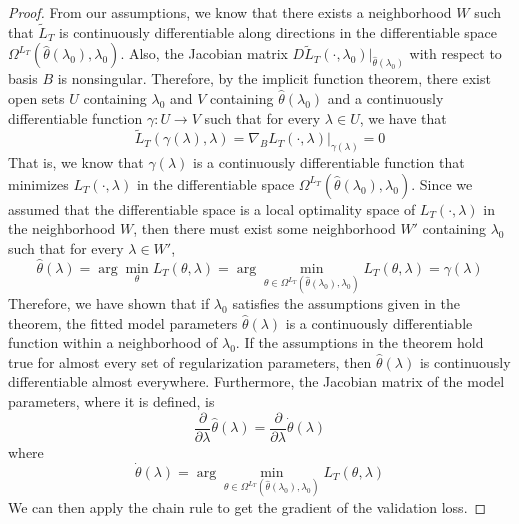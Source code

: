 \documentclass[10pt,letterpaper]{article}
\begin{document}
\begin{proof}
From our assumptions, we know that there exists a neighborhood $W$ such that $\tilde L_T$ is continuously differentiable along directions in the differentiable space $\Omega^{L_T}(\hat \theta(\lambda_0), \lambda_0)$. Also, the Jacobian matrix $D \tilde L_T(\cdot, \lambda_0)|_{\hat \theta(\lambda_0)}$ with respect to basis $B$ is nonsingular. Therefore, by the implicit function theorem, there exist open sets $U$ containing $\lambda_0$ and $V$ containing $\hat \theta(\lambda_0)$ and a continuously differentiable function $\gamma: U \rightarrow V$ such that for every $\lambda \in U$, we have that 
\begin{equation}
\tilde L_T(\gamma(\lambda), \lambda) = \nabla_{B} L_T(\cdot, \lambda)|_{\gamma(\lambda)} = 0
\end{equation}
That is, we know that $\gamma(\lambda)$ is a continuously differentiable function that minimizes $L_T(\cdot, \lambda)$ in the differentiable space  $\Omega^{L_T}(\hat \theta(\lambda_0), \lambda_0)$.
Since we assumed that the differentiable space is a local optimality space of $L_T(\cdot, \lambda)$ in the neighborhood $W$, then there must exist some neighborhood $W'$ containing $\lambda_0$ such that for every $\lambda \in W'$, 
\begin{equation}
\hat \theta(\lambda) =
\arg \min_\theta L_T(\theta, \lambda) =
\arg \min_{\theta \in \Omega^{L_T}(\hat \theta(\lambda_0), \lambda_0)} L_T(\theta, \lambda) =
\gamma(\lambda)
\end{equation}
Therefore, we have shown that if $\lambda_0$ satisfies the assumptions given in the theorem, the fitted model parameters $\hat \theta(\lambda)$ is a continuously differentiable function within a neighborhood of $\lambda_0$. If the assumptions in the theorem hold true for almost every set of regularization parameters, then $\hat \theta(\lambda)$ is continuously differentiable almost everywhere. Furthermore, the Jacobian matrix of the model parameters, where it is defined, is
\begin{equation}
\frac{\partial}{\partial \lambda} \hat \theta(\lambda) = \frac{\partial}{\partial \lambda} \dot \theta(\lambda)
\end{equation}
where 
\begin{equation}
\dot \theta(\lambda) = \arg \min_{\theta \in \Omega^{L_T}(\hat \theta(\lambda_0), \lambda_0)} L_T(\theta, \lambda)
\end{equation}
We can then apply the chain rule to get the gradient of the validation loss.
\end{proof}
\end{document}
